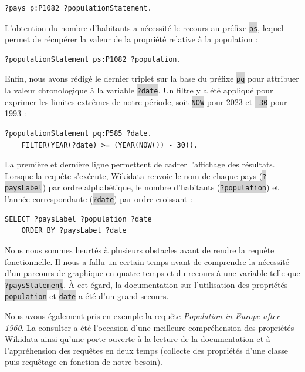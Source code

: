 \documentclass[hidelinks, 12pt]{article}
\newcommand{\code}[1]{\colorbox{LightGray}{\texttt{#1}}}
\begin{document}
\begin{lstlisting}[language=SPARQL]
	?pays p:P1082 ?populationStatement.
\end{lstlisting}

L'obtention du nombre d'habitants a nécessité le recours au préfixe \code{ps}, lequel permet de récupérer la valeur de la propriété relative à la population :
		
\begin{lstlisting}[language=SPARQL]
	?populationStatement ps:P1082 ?population.
\end{lstlisting}

Enfin, nous avons rédigé le dernier triplet sur la base du préfixe \code{pq} pour attribuer la valeur chronologique à la variable \code{?date}. Un filtre y a été appliqué pour exprimer les limites extrêmes de notre période, soit \code{NOW} pour 2023 et \code{-30} pour 1993 :
	
\begin{lstlisting}[language=SPARQL]
	?populationStatement pq:P585 ?date.
	FILTER(YEAR(?date) >= (YEAR(NOW()) - 30)).
\end{lstlisting}

La première et dernière ligne permettent de cadrer l'affichage des résultats. Lorsque la requête s'exécute, Wikidata renvoie le nom de chaque pays (\code{?paysLabel}) par ordre alphabétique, le nombre d'habitants (\code{?population}) et l'année correspondante (\code{?date}) par ordre croissant :

\begin{lstlisting}[language=SPARQL]
	SELECT ?paysLabel ?population ?date
	ORDER BY ?paysLabel ?date
\end{lstlisting}

Nous nous sommes heurtés à plusieurs obstacles avant de rendre la requête fonctionnelle. Il nous a fallu un certain temps avant de comprendre la nécessité d'un parcours de graphique en quatre temps et du recours à une variable telle que \code{?paysStatement}. À cet égard, la documentation sur l'utilisation des propriétés \code{population}\autocite{wikipop} et \code{date}\autocite{wikidate} a été d'un grand secours. 

Nous avons également pris en exemple la requête \emph{Population in Europe after 1960}\autocite{wiki1960}. La consulter a été l'occasion d'une meilleure compréhension des propriétés Wikidata ainsi qu'une porte ouverte à la lecture de la documentation et à l'appréhension des requêtes en deux temps (collecte des propriétés d'une classe puis requêtage en fonction de notre besoin).
\end{document}
